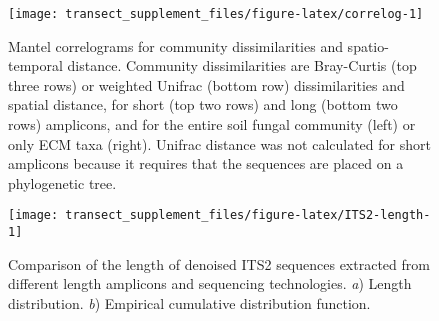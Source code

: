 \documentclass[
]{article}
\begin{document}
\begin{figure}

{\centering \texttt{[image: transect\_supplement\_files/figure-latex/correlog-1]} 

}

\caption[Mantel correlograms for community dissimilarities and spatio-temporal distance]{Mantel correlograms for community dissimilarities and spatio-temporal distance. Community dissimilarities are Bray-Curtis (top three rows) or weighted Unifrac (bottom row) dissimilarities and spatial distance, for short (top two rows) and long (bottom two rows) amplicons, and for the entire soil fungal community (left) or only ECM taxa (right). Unifrac distance was not calculated for short amplicons because it requires that the sequences are placed on a phylogenetic tree.}\label{fig:correlog}
\end{figure}





\begin{figure}

{\centering \texttt{[image: transect\_supplement\_files/figure-latex/ITS2-length-1]} 

}

\caption[Comparison of the length of denoised ITS2 sequences extracted from different length amplicons and sequencing technologies]{Comparison of the length of denoised ITS2 sequences extracted from different length amplicons and sequencing technologies. \emph{a}) Length distribution. \emph{b}) Empirical cumulative distribution function.}\label{fig:ITS2-length}
\end{figure}
\end{document}
